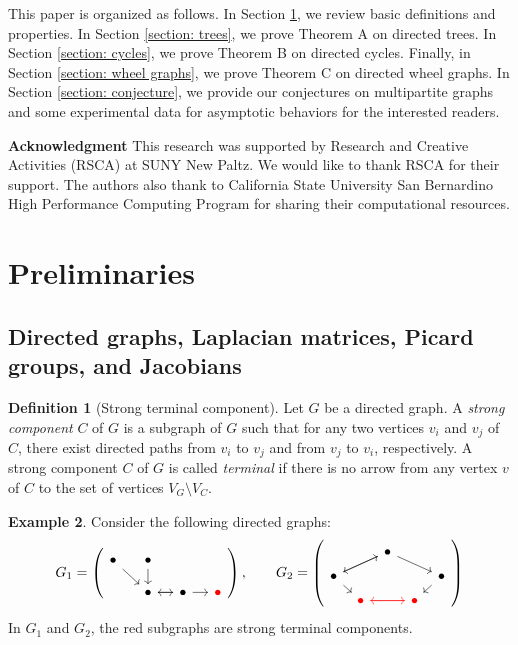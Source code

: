 \documentclass[11pt,reqno]{amsart}
\newcommand{\mycirc}[1][black]{\Large\textcolor{#1}{\ensuremath\bullet}}
\theoremstyle{definition}
\newtheorem{mydef}{Definition}[section]
\newtheorem{example}[mydef]{Example}
\theoremstyle{plain}
\begin{document}
This paper is organized as follows. In Section \ref{section: preliminaries}, we review basic definitions and properties. In Section \ref{section: trees}, we prove Theorem A on directed trees. In Section \ref{section: cycles}, we prove Theorem B on directed cycles. Finally, in Section \ref{section: wheel graphs}, we prove Theorem C on directed wheel graphs. In Section \ref{section: conjecture}, we provide our conjectures on multipartite graphs and some experimental data for asymptotic behaviors for the interested readers. 

\bigskip 


\textbf{Acknowledgment}\hspace{0.1cm} This research was supported by Research and Creative Activities (RSCA) at SUNY New Paltz. We would like to thank RSCA for their support. The authors also thank to California State University San Bernardino High Performance Computing Program for sharing their computational resources. 



\section{Preliminaries}\label{section: preliminaries}

\subsection{Directed graphs, Laplacian matrices, Picard groups, and Jacobians}

\begin{mydef}[Strong terminal component]
Let $G$ be a directed graph. 
A \textit{strong component} $C$ of $G$ is a subgraph of $G$ such that for any two vertices $v_i$ and $v_j$ of $C$, there exist directed paths from $v_i$ to $v_j$ and from $v_j$ to $v_i$, respectively.
A strong component $C$ of $G$ is called \textit{terminal} if there is no arrow from any vertex $v$ of $C$ to the set of vertices $V_G \setminus V_C$. 
\end{mydef}

\begin{example}
Consider the following directed graphs:
\[
G_1=\left(\begin{tikzcd}[row sep=0.4cm, column sep=0.4cm]
	\bullet  \arrow[dr,swap]
	& \bullet \arrow[d,swap] \\
	& \bullet\arrow[r,swap] & \bullet \arrow[l] \arrow[r,swap] & \mycirc[red]
\end{tikzcd} \right), \qquad 
G_2=\left( \begin{tikzcd}[row sep=0.2cm, column sep=0.2cm]
	& & \bullet \arrow[drr] \arrow[dll]& &  \\ 
	\bullet \arrow[urr] \arrow[dr] & & & & \bullet \arrow[dl] \\ 
	& \mycirc[red] \arrow[rr,red] & & \mycirc[red] \arrow[ll,red]& 
\end{tikzcd}\right)
\]
In $G_1$ and $G_2$, the red subgraphs are strong terminal components. 
\end{example}
\end{document}
